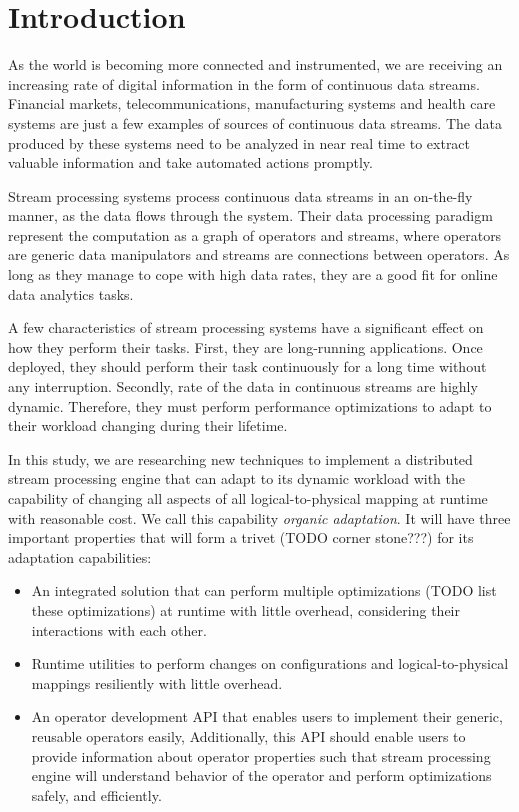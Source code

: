 \section{Introduction}\label{sec:introduction}

As the world is becoming more connected and instrumented, we are receiving an increasing rate of digital information in the form of continuous data streams. Financial markets, telecommunications, manufacturing systems and health care systems are just a few examples of sources of continuous data streams. The data produced by these systems need to be analyzed in near real time to extract valuable information and take automated actions promptly. 

Stream processing systems process continuous data streams in an on-the-fly manner, as the data flows through the system. Their data processing paradigm represent the computation as a graph of operators and streams, where operators are generic data manipulators and streams are connections between operators. As long as they manage to cope with high data rates, they are a good fit for online data analytics tasks. 

A few characteristics of stream processing systems have a significant effect on how they perform their tasks. First, they are long-running applications. Once deployed, they should perform their task continuously for a long time without any interruption. Secondly, rate of the data in continuous streams are highly dynamic. Therefore, they must perform performance optimizations to adapt to their workload changing during their lifetime. 

In this study, we are researching new techniques to implement a distributed stream processing engine that can adapt to its dynamic workload with the capability of changing all aspects of all logical-to-physical mapping at runtime with reasonable cost. We call this capability \textit{organic adaptation}. It will have three important properties that will form a trivet (TODO corner stone???) for its adaptation capabilities:
\begin{itemize}
\item An integrated solution that can perform multiple optimizations (TODO list these optimizations) at runtime with little overhead, considering their interactions with each other.
\item Runtime utilities to perform changes on configurations and logical-to-physical mappings resiliently with little overhead.
\item An operator development API that enables users to implement their generic, reusable operators easily, Additionally, this API should enable users to provide information about operator properties such that stream processing engine will understand behavior of the operator and perform optimizations safely, and efficiently.

\end{itemize}

